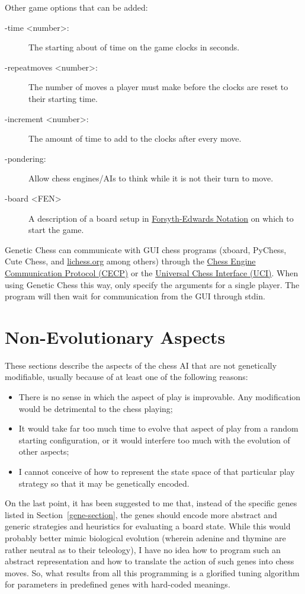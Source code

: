 \documentclass[letterpaper]{article}
\newcommand{\code}[1]{\small\textsf{#1}}
\renewcommand{\_}{\allowbreak\textunderscore\allowbreak}
\begin{document}
Other game options that can be added:
\begin{description}
	\item[\code{-time <number>}:] The starting about of time on the game clocks in seconds.
	\item[\code{-repeat\_moves <number>}:] The number of moves a player must make before the clocks are reset to their starting time.
	\item[\code{-increment <number>}:] The amount of time to add to the clocks after every move.
	\item[\code{-pondering}:] Allow chess engines/AIs to think while it is not their turn to move.
	\item[\code{-board <FEN>}] A description of a board setup in \href{https://en.wikipedia.org/wiki/Forsyth\%E2\%80\%93Edwards_Notation}{Forsyth-Edwards Notation} on which to start the game.
\end{description}
Genetic Chess can communicate with GUI chess programs (xboard, PyChess, Cute Chess, and \href{https://lichess.org}{lichess.org} among others) through the \href{https://www.gnu.org/software/xboard/engine-intf.html}{Chess Engine Communication Protocol (CECP)} or the \href{http://wbec-ridderkerk.nl/html/UCIProtocol.html}{Universal Chess Interface (UCI)}. When using Genetic Chess this way, only specify the arguments for a single player. The program will then wait for communication from the GUI through stdin.


\section{Non-Evolutionary Aspects}

These sections describe the aspects of the chess AI that are not genetically modifiable, usually because of at least one of the following reasons:
\begin{itemize}
	\item There is no sense in which the aspect of play is improvable. Any modification would be detrimental to the chess playing;
	\item It would take far too much time to evolve that aspect of play from a random starting configuration, or it would interfere too much with the evolution of other aspects;
	\item I cannot conceive of how to represent the state space of that particular play strategy so that it may be genetically encoded.
\end{itemize}
On the last point, it has been suggested to me that, instead of the specific genes listed in Section~\ref{gene-section}, the genes should encode more abstract and generic strategies and heuristics for evaluating a board state. While this would probably better mimic biological evolution (wherein adenine and thymine are rather neutral as to their teleology), I have no idea how to program such an abstract representation and how to translate the action of such genes into chess moves. So, what results from all this programming is a glorified tuning algorithm for parameters in predefined genes with hard-coded meanings.
\end{document}
